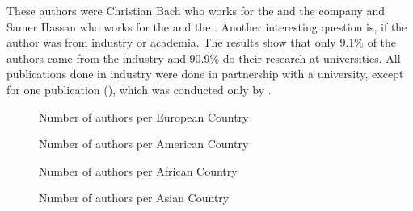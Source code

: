 These authors were Christian Bach \cite{2017_Jaag} who works for the  and the company  and Samer Hassan \cite{2016_Jacynycz} who works for the  and the . Another interesting question is, if the author was from industry or academia. The results show that only 9.1\% of the authors came from the industry and 90.9\% do their research at universities. All publications done in industry were done in partnership with a university, except for one publication (\cite{2017_Tackmann}), which was conducted only by .

%
\clearpage


\begin{figure}[!ht]
	\centering
	\caption{Number of authors per European Country} 	
	\label{fig:rq6_nb_authors_europe}
\end{figure}

\begin{figure}[!ht]
	\centering
	\caption{Number of authors per American Country} 	
	\label{fig:rq6_nb_authors_america}
\end{figure}

\begin{figure}[!ht]
	\centering
	\caption{Number of authors per African Country} 	
	\label{fig:rq6_nb_authors_africa}
\end{figure}


\begin{figure}[!ht]
	\centering
	\caption{Number of authors per Asian Country} 	
	\label{fig:rq6_nb_authors_asia}
\end{figure}